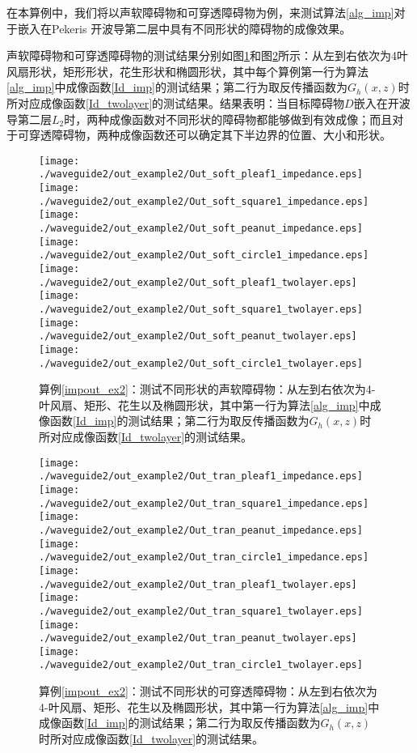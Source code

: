 \begin{example}[不同形状]\label{impout_ex2}
在本算例中，我们将以声软障碍物和可穿透障碍物为例，来测试算法\ref{alg_imp}对于嵌入在Pekeris 开波导第二层中具有不同形状的障碍物的成像效果。

声软障碍物和可穿透障碍物的测试结果分别如图\ref{fig_imp_ex2_1}和图\ref{fig_imp_ex2_2}所示：从左到右依次为4叶风扇形状，矩形形状，花生形状和椭圆形状，其中每个算例第一行为算法\ref{alg_imp}中成像函数\ref{Id_imp}的测试结果；第二行为取反传播函数为$G_h(x,z)$时所对应成像函数\ref{Id_twolayer}的测试结果。结果表明：当目标障碍物$D$嵌入在开波导第二层$L_2$时，两种成像函数对不同形状的障碍物都能够做到有效成像；而且对于可穿透障碍物，两种成像函数还可以确定其下半边界的位置、大小和形状。
\end{example}
\begin{figure}[h]
  \centering
  \texttt{[image: ./waveguide2/out\_example2/Out\_soft\_pleaf1\_impedance.eps]}
  \texttt{[image: ./waveguide2/out\_example2/Out\_soft\_square1\_impedance.eps]}
  \texttt{[image: ./waveguide2/out\_example2/Out\_soft\_peanut\_impedance.eps]}
  \texttt{[image: ./waveguide2/out\_example2/Out\_soft\_circle1\_impedance.eps]}
  \texttt{[image: ./waveguide2/out\_example2/Out\_soft\_pleaf1\_twolayer.eps]}
  \texttt{[image: ./waveguide2/out\_example2/Out\_soft\_square1\_twolayer.eps]}
  \texttt{[image: ./waveguide2/out\_example2/Out\_soft\_peanut\_twolayer.eps]}
  \texttt{[image: ./waveguide2/out\_example2/Out\_soft\_circle1\_twolayer.eps]}  
  \caption{算例\ref{impout_ex2}：测试不同形状的声软障碍物：从左到右依次为4-叶风扇、矩形、花生以及椭圆形状，其中第一行为算法\ref{alg_imp}中成像函数\ref{Id_imp}的测试结果；第二行为取反传播函数为$G_h(x,z)$时所对应成像函数\ref{Id_twolayer}的测试结果。}
  \label{fig_imp_ex2_1}
\end{figure}
\begin{figure}[h]
	\centering
	\texttt{[image: ./waveguide2/out\_example2/Out\_tran\_pleaf1\_impedance.eps]}
	\texttt{[image: ./waveguide2/out\_example2/Out\_tran\_square1\_impedance.eps]}
	\texttt{[image: ./waveguide2/out\_example2/Out\_tran\_peanut\_impedance.eps]}
	\texttt{[image: ./waveguide2/out\_example2/Out\_tran\_circle1\_impedance.eps]}
	\texttt{[image: ./waveguide2/out\_example2/Out\_tran\_pleaf1\_twolayer.eps]}
	\texttt{[image: ./waveguide2/out\_example2/Out\_tran\_square1\_twolayer.eps]}
	\texttt{[image: ./waveguide2/out\_example2/Out\_tran\_peanut\_twolayer.eps]}
	\texttt{[image: ./waveguide2/out\_example2/Out\_tran\_circle1\_twolayer.eps]}  
	\caption{算例\ref{impout_ex2}：测试不同形状的可穿透障碍物：从左到右依次为4-叶风扇、矩形、花生以及椭圆形状，其中第一行为算法\ref{alg_imp}中成像函数\ref{Id_imp}的测试结果；第二行为取反传播函数为$G_h(x,z)$时所对应成像函数\ref{Id_twolayer}的测试结果。}
	\label{fig_imp_ex2_2}
\end{figure}
